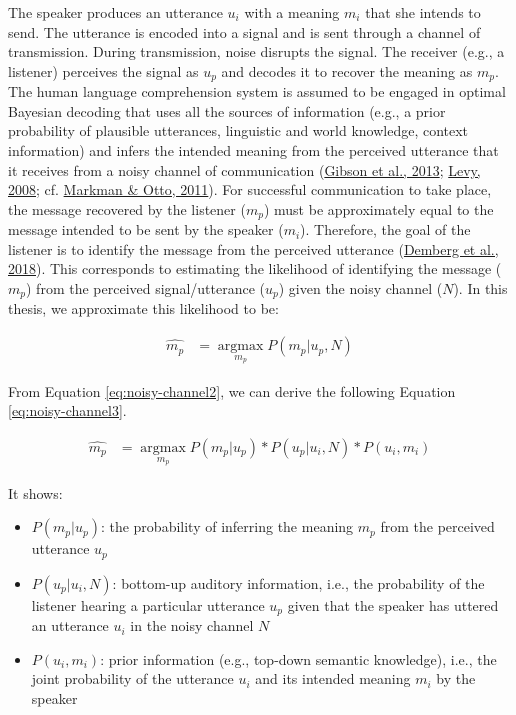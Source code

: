 \documentclass[a4paper, nobind]{templates/ociamthesis}
\providecommand{\tightlist}{%
  \setlength{\itemsep}{0pt}\setlength{\parskip}{0pt}}
\begin{document}
The speaker produces an utterance \(u_i\) with a meaning \(m_i\) that she intends to send.
The utterance is encoded into a signal and is sent through a channel of transmission.
During transmission, noise disrupts the signal.
The receiver (e.g., a listener) perceives the signal as \(u_p\) and decodes it to recover the meaning as \(m_p\).
The human language comprehension system is assumed to be engaged in optimal Bayesian decoding that uses all the sources of information
(e.g., a prior probability of plausible utterances, linguistic and world knowledge, context information)
and infers the intended meaning from the perceived utterance that it receives from a noisy channel of communication (\protect\hyperlink{ref-Gibson2013}{Gibson et al., 2013}; \protect\hyperlink{ref-Levy2008}{Levy, 2008}; cf. \protect\hyperlink{ref-Markman2011}{Markman \& Otto, 2011}).
For successful communication to take place, the message recovered by the listener (\(m_p\)) must be approximately equal to the message intended to be sent by the speaker (\(m_i\)).
Therefore, the goal of the listener is to identify the message from the perceived utterance (\protect\hyperlink{ref-Demberg2018}{Demberg et al., 2018}).
This corresponds to estimating the likelihood of identifying the message (\(m_p\)) from the perceived signal/utterance (\(u_p\)) given the noisy channel (\(N\)).
In this thesis, we approximate this likelihood to be:

\begin{align} \label{eq:noisy-channel2}
\hat{m_p} &= \mathop{\mathrm{argmax}}\limits_{m_p} P(m_p | u_p, N)
\end{align}

From Equation \eqref{eq:noisy-channel2}, we can derive the following Equation \eqref{eq:noisy-channel3}.

\begin{align} \label{eq:noisy-channel3}
\hat{m_p} &= \mathop{\mathrm{argmax}}\limits_{m_p} P(m_p | u_p) * P(u_p | u_i, N) * P(u_i , m_i)
\end{align}

It shows:

\begin{itemize}
\tightlist
\item
  \(P(m_p | u_p)\): the probability of inferring the meaning \(m_p\) from the perceived utterance \(u_p\)
\item
  \(P(u_p|u_i, N)\): bottom-up auditory information, i.e., the probability of the listener hearing a particular utterance \(u_p\) given that the speaker has uttered an utterance \(u_i\) in the noisy channel \(N\)
\item
  \(P(u_i,m_i)\): prior information (e.g., top-down semantic knowledge), i.e., the joint probability of the utterance \(u_i\) and its intended meaning \(m_i\) by the speaker
\end{itemize}
\end{document}
